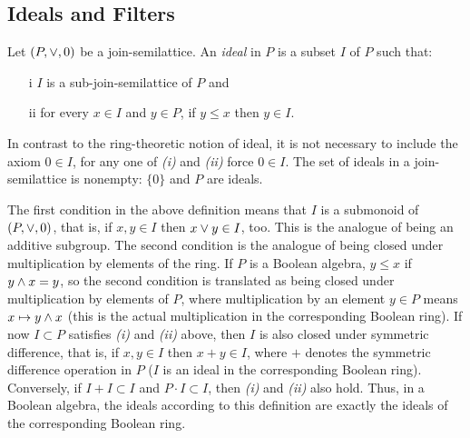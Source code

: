 \theoremstyle{plain}
\newtheorem{thmSeparation}{Proposition}[section]
\newtheorem{propoLatPrimeIdeal}[thmSeparation]{Proposition}
\newtheorem{thmMaxDisjointIdealIsPrime}[thmSeparation]{Theorem}
\newtheorem{coroDistLatIsConcrete}[thmSeparation]{Corollary}
\newtheorem{propoBoolPrimeIsMax}[thmSeparation]{Proposition}
\newtheorem{propoPrimeIdealIsMax}[thmSeparation]{Proposition}
\newtheorem{lemmaInABooleanAlgebra}[thmSeparation]{Lemma}
\newtheorem{lemmaFIP}[thmSeparation]{Lemma}
\newtheorem{lemmaFilterGeneratedBySubset}[thmSeparation]{Lemma}
\newtheorem{propoPrimeFilterIsMax}[thmSeparation]{Proposition}
\newtheorem{thmMaxDisjointFilterIsPrime}[thmSeparation]{Theorem}
\newtheorem{thmFilterSeparation}[thmSeparation]{Corollary}

\theoremstyle{remark}
\newtheorem*{remarkKerIsIdealIsKer}{Remark}
\newtheorem*{remarkKerIsNotEnough}{Remark}
\newtheorem*{remarkNotAnIdeal}{Remark}
\newtheorem*{remarkPrimeFilterIsPrimeFilter}{Remark}


\subsection{Ideals and Filters}
Let $(P,\vee,0)$ be a join-semilattice. An \emph{ideal} in $P$ is a
subset $I$ of $P$ such that:
\begin{itemize}
	\item[i] $I$ is a sub-join-semilattice of $P$ and
	\item[ii] for every $x\in I$ and $y\in P$, if $y\leq x$ then
		$y\in I$.
\end{itemize}
%
In contrast to the ring-theoretic notion of ideal, it is not necessary to
include the axiom $0\in I$, for any one of \textit{(i)} and \textit{(ii)}
force $0\in I$. The set of ideals in a join-semilattice is nonempty:
$\{0\}$ and $P$ are ideals.

The first condition in the above definition means that $I$ is a submonoid
of $(P,\vee,0)$, that is, if $x,y\in I$ then $x\vee y\in I$, too.
This is the analogue of being an additive subgroup. The second condition is
the analogue of being closed under multiplication by elements of the ring.
If $P$ is a Boolean algebra, $y\leq x$ if $y\wedge x=y$, so the second
condition is translated as being closed under multiplication by elements
of $P$, where multiplication by an element $y\in P$ means
$x\mapsto y\wedge x$ (this is the actual multiplication in the
corresponding Boolean ring). If now $I\subset P$ satisfies \textit{(i)}
and \textit{(ii)} above, then $I$ is also closed under symmetric difference,
that is, if $x,y\in I$ then $x+y\in I$, where $+$ denotes the symmetric
difference operation in $P$ ($I$ is an ideal in the corresponding Boolean
ring). Conversely, if $I+I\subset I$ and $P\cdot I\subset I$, then
\textit{(i)} and \textit{(ii)} also hold. Thus, in a Boolean algebra, the
ideals according to this definition are exactly the ideals of the
corresponding Boolean ring.

